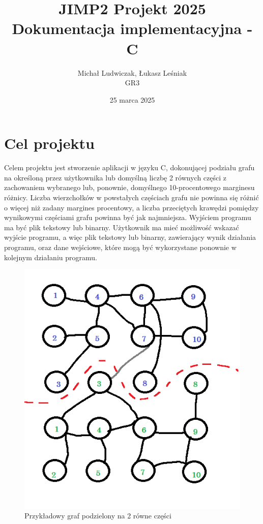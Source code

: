 \documentclass{article}
\title{\Huge JIMP2 Projekt 2025 \\ {\huge Dokumentacja implementacyjna - C}}
\author{Michał Ludwiczak, Łukasz Leśniak \\ GR3}
\date{25 marca 2025}
\begin{document}
\maketitle

\tableofcontents






\section{Cel projektu}

Celem projektu jest stworzenie aplikacji w języku C, dokonującej podziału grafu na określoną przez użytkownika lub domyślną liczbę 2 równych części z zachowaniem wybranego lub, ponownie, domyślnego 10-procentowego marginesu różnicy. Liczba wierzchołków w powstałych częściach grafu nie powinna się różnić o więcej niż zadany margines procentowy, a liczba przeciętych krawędzi pomiędzy wynikowymi częściami grafu powinna być jak najmniejsza. Wyjściem programu ma być plik tekstowy lub binarny. Użytkownik ma mieć możliwość wskazać wyjście programu, a więc plik tekstowy lub binarny, zawierający wynik działania programu, oraz dane wejściowe, które mogą być wykorzystane ponownie w kolejnym działaniu programu.



\begin{figure}[ht]
    \centering
    \includegraphics[width=0.75\linewidth]{img/graph.png}
    \caption{Przykładowy graf podzielony na 2 równe części}
    \label{fig:graph}
\end{figure}
\end{document}
